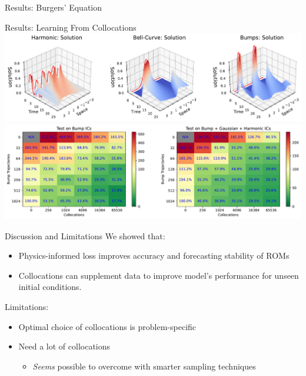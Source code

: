 \documentclass[8pt]{beamer}
\begin{document}
\begin{frame}{Results: Burgers' Equation}

\end{frame}

\begin{frame}{Results: Learning From Collocations}
\includegraphics[width=\textwidth]{Figures/burgers_examples_of_ics.pdf}
\includegraphics[width=\textwidth]{Figures/data_vs_collocations.pdf}
\end{frame}

\begin{frame}{Discussion and Limitations}
We showed that:
\begin{itemize}
	\item Physics-informed loss improves accuracy and forecasting stability of ROMs
	\item Collocations can supplement data to improve model's performance for unseen initial conditions.
\end{itemize}
\vspace{2em}
Limitations:
\begin{itemize}
	\item Optimal choice of collocations is problem-specific
	\item Need a lot of collocations
	\begin{itemize}
		\item \textit{Seems} possible to overcome with smarter sampling techniques
	\end{itemize}
\end{itemize}
\end{frame}
\end{document}
